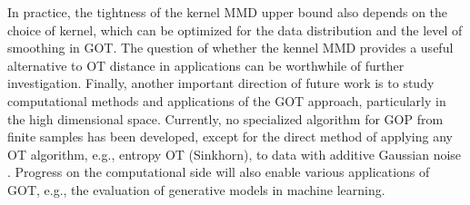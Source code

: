 \documentclass{article}
\theoremstyle{definition}
\begin{document}
In practice, the tightness of the kernel MMD upper bound also depends on the choice of kernel, which can be optimized for the data distribution and the level of smoothing in GOT. The question of whether the kennel MMD provides a useful alternative to OT distance in applications can be worthwhile of further investigation.  
Finally, another important direction of future work is to study computational methods and applications of the GOT approach, particularly in the high dimensional space. 
Currently, no specialized algorithm for GOP from finite samples has been developed,
except for the direct method of applying any OT algorithm, e.g., entropy OT (Sinkhorn), to data with additive Gaussian noise \cite{goldfeld:2020}.
Progress on the computational side will also enable various applications of GOT, e.g., the evaluation of generative models in machine learning.

%
%
%


%
\end{document}
